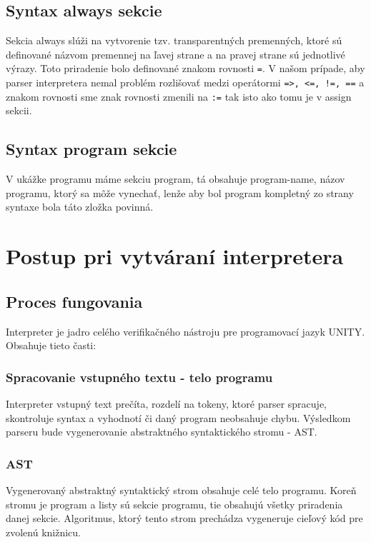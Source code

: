 \subsection{Syntax always sekcie}
Sekcia always slúži na vytvorenie tzv. transparentných premenných, ktoré sú definované názvom premennej na ľavej strane 
a na pravej strane sú jednotlivé výrazy. Toto priradenie bolo definované znakom rovnosti \texttt{=}. V našom prípade, aby parser
interpretera nemal problém rozlišovať medzi operátormi \texttt{=>, <=, !=, ==} a znakom rovnosti sme znak rovnosti 
zmenili na \texttt{:=} tak isto ako tomu je v assign sekcii.

\subsection{Syntax program sekcie}
V ukážke programu máme sekciu program, tá obsahuje program-name, názov programu, ktorý sa môže vynechať, lenže 
aby bol program kompletný zo strany syntaxe bola táto zložka povinná.

\section{Postup pri vytváraní interpretera}

\subsection{Proces fungovania}
Interpreter je jadro celého verifikačného nástroju pre programovací jazyk UNITY. 
Obsahuje tieto časti:

\subsubsection{Spracovanie vstupného textu - telo programu}
Interpreter vstupný text prečíta, rozdelí na tokeny, ktoré parser spracuje, skontroluje syntax a vyhodnotí 
či daný program neobsahuje chybu. Výsledkom parseru bude vygenerovanie abstraktného syntaktického stromu - AST.

\subsubsection{AST}
Vygenerovaný abstraktný syntaktický strom obsahuje celé telo programu. Koreň stromu je program a 
listy sú sekcie programu, tie obsahujú všetky priradenia danej sekcie. Algoritmus, ktorý 
tento strom prechádza vygeneruje cieľový kód pre zvolenú knižnicu.

